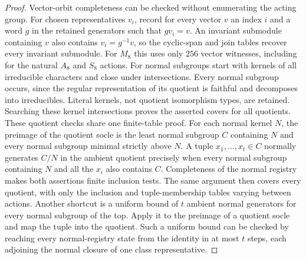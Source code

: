 \begin{proof}
Vector-orbit completeness can be checked without enumerating the acting
group. For chosen representatives $v_i$, record for every vector $v$ an
index $i$ and a word $g$ in the retained generators such that $gv_i=v$.
An invariant submodule containing $v$ also contains $v_i=g^{-1}v$,
so the cyclic-span and join tables recover every invariant submodule.
For $M_8$ this uses only $256$ vector witnesses, including for the natural
$A_8$ and $S_8$ actions.
For normal subgroups start with kernels of all irreducible characters
and close under intersections. Every normal subgroup occurs, since
the regular representation of its quotient is faithful and decomposes
into irreducibles. Literal kernels, not quotient isomorphism types,
are retained. Searching these kernel intersections proves the asserted
covers for all quotients.
These quotient checks share one finite-table proof. For each normal kernel
$N$, the preimage of the quotient socle is the least normal subgroup $C$
containing $N$ and every normal subgroup minimal strictly above $N$.
A tuple $x_1,\ldots,x_t\in C$ normally generates $C/N$ in the ambient
quotient precisely when every normal subgroup containing $N$ and all the
$x_i$ also contains $C$.
Completeness of the normal registry makes both assertions finite inclusion
tests. The same argument then covers every quotient, with only the inclusion
and tuple-membership tables varying between actions.
Another shortcut is a uniform bound of $t$ ambient normal generators
for every normal subgroup of the top. Apply it to the preimage of a
quotient socle and map the tuple into the quotient. Such a uniform bound
can be checked by reaching every normal-registry state from the identity
in at most $t$ steps, each adjoining the normal closure of one class
representative.


\end{proof}
